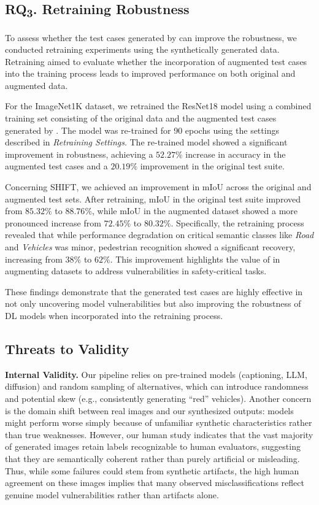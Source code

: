 \subsection{RQ\textsubscript{3}. Retraining Robustness}

To assess whether the test cases generated by \approach can improve the robustness, we conducted retraining experiments using the synthetically generated data. Retraining aimed to evaluate whether the incorporation of augmented test cases into the training process leads to improved performance on both original and augmented data.

For the ImageNet1K dataset, we retrained the ResNet18 model using a combined training set consisting of the original data and the augmented test cases generated by \approach. The model was re-trained for 90 epochs using the settings described in \textit{Retraining Settings}. The re-trained model showed a significant improvement in robustness, achieving a $52.27\%$ increase in accuracy in the augmented test cases and a $20.19\%$ improvement in the original test suite.

Concerning SHIFT, we achieved an improvement in mIoU across the original and augmented test sets. After retraining, mIoU in the original test suite improved from $85.32\%$ to $88.76\%$, while mIoU in the augmented dataset showed a more pronounced increase from $72.45\%$ to $80.32\%$.
Specifically, the retraining process revealed that while performance degradation on critical semantic classes like \textit{Road} and \textit{Vehicles} was minor, pedestrian recognition showed a significant recovery, increasing from $38\%$ to $62\%$. This improvement highlights the value of \approach in augmenting datasets to address vulnerabilities in safety-critical tasks.

These findings demonstrate that the generated test cases are highly effective in not only uncovering model vulnerabilities but also improving the robustness of DL models when incorporated into the retraining process.

\subsection{Threats to Validity}
\noindent\textbf{Internal Validity.}
Our pipeline relies on pre-trained models (captioning, LLM, diffusion) and random sampling of alternatives, which can introduce randomness and potential skew (e.g., consistently generating “red” vehicles). Another concern is the domain shift between real images and our synthesized outputs: models might perform worse simply because of unfamiliar synthetic characteristics rather than true weaknesses. However, our human study indicates that the vast majority of generated images retain labels recognizable to human evaluators, suggesting that they are semantically coherent rather than purely artificial or misleading. Thus, while some failures could stem from synthetic artifacts, the high human agreement on these images implies that many observed misclassifications reflect genuine model vulnerabilities rather than artifacts alone.

